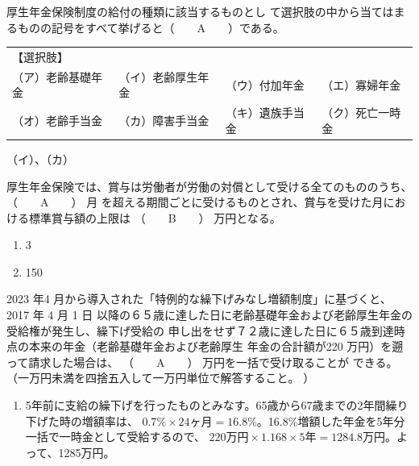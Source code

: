 \begin{fillblank}[年金1 2023 問題1(5)イ(e)]
  厚生年金保険制度の給付の種類に該当するものとし
て選択肢の中から当てはまるものの記号をすべて挙げると（　　A　　）である。

\begin{table}[htbp]
  \centering
  \begin{tabular}{|llll|} \hline
    【選択肢】 & & & \\ 
    （ア）老齢基礎年金 & （イ）老齢厚生年金 & （ウ）付加年金 & （エ）寡婦年金 \\ 
    （オ）老齢手当金 & （カ）障害手当金 & （キ）遺族手当金 & （ク）死亡一時金 \\ \hline
  \end{tabular}
\end{table}
\end{fillblank}

\begin{answerbox}
  （イ）、（カ）
\end{answerbox}

\begin{fillblank}[年金1 2024 問題1(5)ア]
  厚生年金保険では、賞与は労働者が労働の対償として受ける全てのもののうち、 （　　A　　） 月
を超える期間ごとに受けるものとされ、賞与を受けた月における標準賞与額の上限は
（　　B　　） 万円となる。
\end{fillblank}

\begin{answerbox}
  \begin{enumerate}[A: ]
    \item 3
    \item 150
  \end{enumerate}
\end{answerbox}

\begin{fillblank}[年金1 2024 問題1(5)イ]
  2023 年4 月から導入された「特例的な繰下げみなし増額制度」に基づくと、2017 年 4 月 1 日
以降の６５歳に達した日に老齢基礎年金および老齢厚生年金の受給権が発生し、繰下げ受給の
申し出をせず７２歳に達した日に６５歳到達時点の本来の年金（老齢基礎年金および老齢厚生
年金の合計額が220 万円）を遡って請求した場合は、 （　　A　　） 万円を一括で受け取ることが
できる。 （一万円未満を四捨五入して一万円単位で解答すること。 ）
\end{fillblank}

\begin{answerbox}
  \begin{enumerate}[A: ]
    \item 5年前に支給の繰下げを行ったものとみなす。65歳から67歳までの2年間繰り下げた時の増額率は、
    $0.7\% \times 24ヶ月 = 16.8\%$。16.8\%増額した年金を5年分一括で一時金として受給するので、
    $220万円 \times 1.168 \times 5年 = 1284.8万円$。よって、1285万円。
  \end{enumerate}
\end{answerbox}

